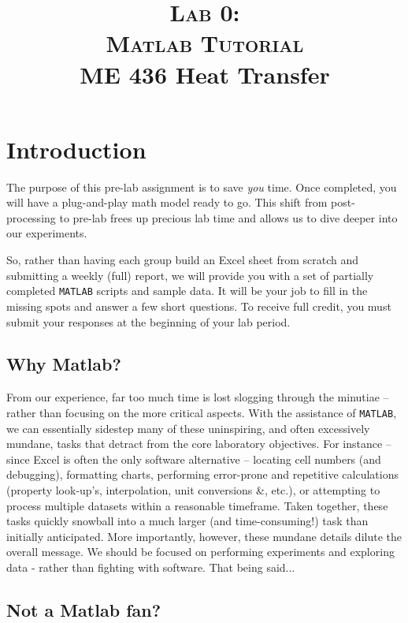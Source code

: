 \documentclass[11pt, letterpaper]{article}
\title{ \textsc{Lab 0: \\ Matlab Tutorial} \\ {\large  \color{darkgray} ME 436 Heat Transfer}}
\begin{document}
\date{}
\maketitle
\thispagestyle{firstpage} 


\section*{Introduction}

The purpose of this pre-lab assignment is to save \textit{you} time. Once completed, you will have a plug-and-play math model ready to go. This shift from post-processing to pre-lab frees up precious lab time and allows us to dive deeper into our experiments.

So, rather than having each group build an Excel sheet from scratch and submitting a weekly (full) report, we will provide you with a set of partially completed \texttt{MATLAB} scripts and sample data. It will be your job to fill in the missing spots and answer a few short questions. To receive full credit, you must submit your responses at the beginning of your lab period.

\subsection*{Why Matlab?}

From our experience, far too much time is lost slogging through the minutiae -- rather than focusing on the more critical aspects. With the assistance of \texttt{MATLAB}, we can essentially sidestep many of these uninspiring, and often excessively mundane, tasks that detract from the core laboratory objectives. For instance -- since Excel is often the only software alternative -- locating cell numbers (and debugging), formatting charts, performing error-prone and repetitive calculations (property look-up's, interpolation, unit conversions \&, etc.), or attempting to process multiple datasets within a reasonable timeframe. Taken together, these tasks quickly snowball into a much larger (and time-consuming!) task than initially anticipated. More importantly, however, these mundane details dilute the overall message. We should be focused on performing experiments and exploring data - rather than fighting with software. That being said...


\subsection*{Not a Matlab fan? }
\end{document}

